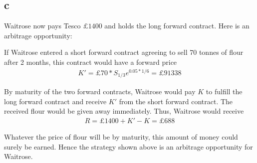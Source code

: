 \documentclass{article}
\begin{document}
\subsection*{c}
Waitrose now pays Tesco $\pounds 1400$ and holds the long forward contract. Here is an arbitrage opportunity:

If Waitrose entered a short forward contract agreeing to sell 70 tonnes of flour after 2 months, this contract would have a forward price
\begin{align*}
	K'=\pounds 70*S_{1/3}e^{0.05*1/6}=\pounds 91338
\end{align*}

By maturity of the two forward contracts, Waitrose would pay $K$ to fulfill the long forward contract and receive $K'$ from the short forward contract. The received flour would be given away immediately. Thus, Waitrose would receive
\begin{align*}
	R=\pounds 1400 +K'-K=\pounds 688
\end{align*}

Whatever the price of flour will be by maturity, this amount of money could surely be earned. Hence the strategy shown above is an arbitrage opportunity for Waitrose.
\end{document}
